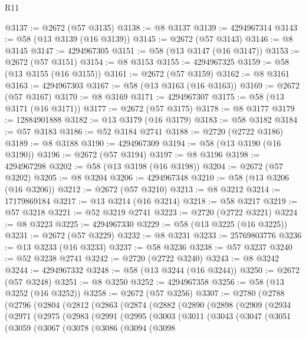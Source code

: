 \begin{lexlean}{R11}
\begin{coremodule}
@3137 := @2672 (@57 @3135)
@3138 := @8 @3137
@3139 := 4294967314
@3143 := @58 (@13 @3139 (@16 @3139))
@3145 := @2672 (@57 @3143)
@3146 := @8 @3145
@3147 := 4294967305
@3151 := @58 (@13 @3147 (@16 @3147))
@3153 := @2672 (@57 @3151)
@3154 := @8 @3153
@3155 := 4294967325
@3159 := @58 (@13 @3155 (@16 @3155))
@3161 := @2672 (@57 @3159)
@3162 := @8 @3161
@3163 := 4294967303
@3167 := @58 (@13 @3163 (@16 @3163))
@3169 := @2672 (@57 @3167)
@3170 := @8 @3169
@3171 := 4294967307
@3175 := @58 (@13 @3171 (@16 @3171))
@3177 := @2672 (@57 @3175)
@3178 := @8 @3177
@3179 := 12884901888
@3182 := @13 @3179 (@16 @3179)
@3183 := @58 @3182
@3184 := @57 @3183
@3186 := @52 @3184 @2741
@3188 := @2720 (@2722 @3186)
@3189 := @8 @3188
@3190 := 4294967309
@3194 := @58 (@13 @3190 (@16 @3190))
@3196 := @2672 (@57 @3194)
@3197 := @8 @3196
@3198 := 4294967298
@3202 := @58 (@13 @3198 (@16 @3198))
@3204 := @2672 (@57 @3202)
@3205 := @8 @3204
@3206 := 4294967348
@3210 := @58 (@13 @3206 (@16 @3206))
@3212 := @2672 (@57 @3210)
@3213 := @8 @3212
@3214 := 17179869184
@3217 := @13 @3214 (@16 @3214)
@3218 := @58 @3217
@3219 := @57 @3218
@3221 := @52 @3219 @2741
@3223 := @2720 (@2722 @3221)
@3224 := @8 @3223
@3225 := 4294967330
@3229 := @58 (@13 @3225 (@16 @3225))
@3231 := @2672 (@57 @3229)
@3232 := @8 @3231
@3233 := 25769803776
@3236 := @13 @3233 (@16 @3233)
@3237 := @58 @3236
@3238 := @57 @3237
@3240 := @52 @3238 @2741
@3242 := @2720 (@2722 @3240)
@3243 := @8 @3242
@3244 := 4294967332
@3248 := @58 (@13 @3244 (@16 @3244))
@3250 := @2672 (@57 @3248)
@3251 := @8 @3250
@3252 := 4294967358
@3256 := @58 (@13 @3252 (@16 @3252))
@3258 := @2672 (@57 @3256)
@3307 := @2780
    (@2788
      (@2796
        (@2804
          (@2812
            (@2863
              (@2874
                (@2882
                  (@2890
                    (@2898
                      (@2909
                        (@2934
                          (@2971
                            (@2975
                              (@2983
                                (@2991
                                  (@2995
                                    (@3003
                                      (@3011
                                        (@3043
                                          (@3047
                                            (@3051
                                              (@3059
                                                (@3067
                                                  (@3078
                                                    (@3086
                                                      (@3094
                                                        (@3098

\end{coremodule}
\end{lexlean}
